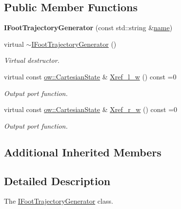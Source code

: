 \subsection*{Public Member Functions}
\begin{DoxyCompactItemize}
\item 
{\bfseries I\+Foot\+Trajectory\+Generator} (const std\+::string \&\hyperlink{classow_1_1GenericModuleBase_a4b712883728cdbab7779e27f9a23689c}{name})\hypertarget{classow_1_1IFootTrajectoryGenerator_ae721f51dd5d63686bd70ecaf963e3ded}{}\label{classow_1_1IFootTrajectoryGenerator_ae721f51dd5d63686bd70ecaf963e3ded}

\item 
virtual \hyperlink{classow_1_1IFootTrajectoryGenerator_aace01723d713ce0a7ad82ae950555272}{$\sim$\+I\+Foot\+Trajectory\+Generator} ()\hypertarget{classow_1_1IFootTrajectoryGenerator_aace01723d713ce0a7ad82ae950555272}{}\label{classow_1_1IFootTrajectoryGenerator_aace01723d713ce0a7ad82ae950555272}

\begin{DoxyCompactList}\small\item\em Virtual destructor. \end{DoxyCompactList}\item 
virtual const \hyperlink{classow__core_1_1CartesianState}{ow\+::\+Cartesian\+State} \& \hyperlink{classow_1_1IFootTrajectoryGenerator_a4538439fd6596ee24d31beece8ed0c7a}{Xref\+\_\+l\+\_\+w} () const =0
\begin{DoxyCompactList}\small\item\em Output port function. \end{DoxyCompactList}\item 
virtual const \hyperlink{classow__core_1_1CartesianState}{ow\+::\+Cartesian\+State} \& \hyperlink{classow_1_1IFootTrajectoryGenerator_a3d9a8bd1b61d6c7e033522fe30a7f05e}{Xref\+\_\+r\+\_\+w} () const =0
\begin{DoxyCompactList}\small\item\em Output port function. \end{DoxyCompactList}\end{DoxyCompactItemize}
\subsection*{Additional Inherited Members}


\subsection{Detailed Description}
The \hyperlink{classow_1_1IFootTrajectoryGenerator}{I\+Foot\+Trajectory\+Generator} class. 

